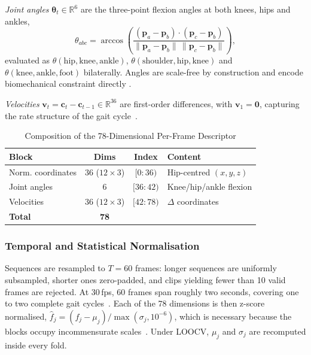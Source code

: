 \documentclass[journal]{IEEEtran}
\newcommand{\tabhead}[1]{\textbf{#1}}
\begin{document}
\emph{Joint angles} $\boldsymbol{\theta}_t \in \mathbb{R}^{6}$ are the
three-point flexion angles at both knees, hips and ankles,
\begin{equation}
\theta_{abc} = \arccos\!\left(
\frac{(\mathbf{p}_a - \mathbf{p}_b) \cdot (\mathbf{p}_c - \mathbf{p}_b)}
{\lVert \mathbf{p}_a - \mathbf{p}_b \rVert \,
 \lVert \mathbf{p}_c - \mathbf{p}_b \rVert}\right),
\end{equation}
evaluated as $\theta(\text{hip},\text{knee},\text{ankle})$,
$\theta(\text{shoulder},\text{hip},\text{knee})$ and
$\theta(\text{knee},\text{ankle},\text{foot})$ bilaterally. Angles are
scale-free by construction and encode biomechanical constraint directly
\cite{perry_gait,whittle_gait}.

\emph{Velocities} $\mathbf{v}_t = \mathbf{c}_t - \mathbf{c}_{t-1} \in
\mathbb{R}^{36}$ are first-order differences, with $\mathbf{v}_1 = \mathbf{0}$,
capturing the rate structure of the gait cycle~\cite{phinyomark}.

\begin{table}[!t]
\caption{Composition of the 78-Dimensional Per-Frame Descriptor}
\label{tab:features}
\centering
\footnotesize
\begin{tabular}{@{}lccl@{}}
\toprule
\tabhead{Block} & \tabhead{Dims} & \tabhead{Index} & \tabhead{Content} \\
\midrule
Norm. coordinates & 36 ($12\times3$) & $[0{:}36)$  & Hip-centred $(x,y,z)$ \\
Joint angles      & 6                & $[36{:}42)$ & Knee/hip/ankle flexion \\
Velocities             & 36 ($12\times3$) & $[42{:}78)$ & $\Delta$ coordinates \\
\midrule
\textbf{Total}         & \textbf{78}      &             & \\
\bottomrule
\end{tabular}
\end{table}

\subsubsection{Temporal and Statistical Normalisation}
Sequences are resampled to $T = 60$ frames: longer sequences are uniformly
subsampled, shorter ones zero-padded, and clips yielding fewer than 10 valid
frames are rejected. At 30\,fps, 60 frames span roughly two seconds, covering
one to two complete gait cycles~\cite{perry_gait}. Each of the 78 dimensions is
then z-score normalised,
$\hat{f}_j = (f_j - \mu_j)/\max(\sigma_j, 10^{-6})$,
which is necessary because the blocks occupy incommensurate
scales~\cite{lecun_efficient}. Under LOOCV, $\mu_j$ and $\sigma_j$ are
recomputed inside every fold.
\end{document}
